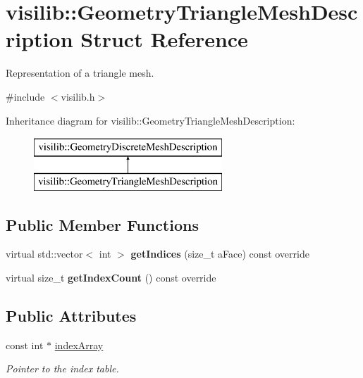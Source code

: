 \hypertarget{structvisilib_1_1_geometry_triangle_mesh_description}{}\section{visilib\+::Geometry\+Triangle\+Mesh\+Description Struct Reference}
\label{structvisilib_1_1_geometry_triangle_mesh_description}


Representation of a triangle mesh.  




{\ttfamily \#include $<$visilib.\+h$>$}

Inheritance diagram for visilib\+::Geometry\+Triangle\+Mesh\+Description\+:\begin{figure}[H]
\begin{center}
\leavevmode
\includegraphics[height=2.000000cm]{structvisilib_1_1_geometry_triangle_mesh_description}
\end{center}
\end{figure}
\subsection*{Public Member Functions}
\begin{DoxyCompactItemize}
\item 
\mbox{\label{structvisilib_1_1_geometry_triangle_mesh_description_ac3bbf60ef76b5bbbd8731ca75113a1c7}} 
virtual std\+::vector$<$ int $>$ {\bfseries get\+Indices} (size\+\_\+t a\+Face) const override
\item 
\mbox{\label{structvisilib_1_1_geometry_triangle_mesh_description_a7fd6d7e8f1a287607a18ad507be4c283}} 
virtual size\+\_\+t {\bfseries get\+Index\+Count} () const override
\end{DoxyCompactItemize}
\subsection*{Public Attributes}
\begin{DoxyCompactItemize}
\item 
\mbox{\label{structvisilib_1_1_geometry_triangle_mesh_description_a161f5e6343b08d34bac9eb58b6ee6aa5}} 
const int $\ast$ \mbox{\hyperlink{structvisilib_1_1_geometry_triangle_mesh_description_a161f5e6343b08d34bac9eb58b6ee6aa5}{index\+Array}}
\begin{DoxyCompactList}\small\item\em Pointer to the index table. \end{DoxyCompactList}\end{DoxyCompactItemize}


